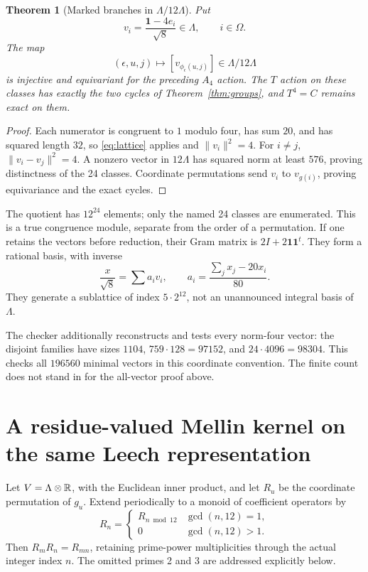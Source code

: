 \documentclass[11pt,reqno]{amsart}
\newtheorem{theorem}{Theorem}[section]
\theoremstyle{definition}\newtheorem{definition}[theorem]{Definition}
\theoremstyle{remark}\newtheorem{remark}[theorem]{Remark}
\begin{document}
\begin{theorem}[Marked branches in $\Lambda/12\Lambda$]\label{thm:mod12}
Put
\[
v_i=\frac{\mathbf1-4e_i}{\sqrt8}\in\Lambda,\qquad i\in\Omega.
\]
The map
\[
(\epsilon,u,j)\longmapsto[v_{\phi_\epsilon(u,j)}]\in\Lambda/12\Lambda
\]
is injective and equivariant for the preceding $A_4$ action. The $T$ action on these classes has exactly the two cycles of Theorem~\ref{thm:groups}, and $T^4=C$ remains exact on them.
\end{theorem}
\begin{proof}
Each numerator is congruent to $1$ modulo four, has sum $20$, and has squared length $32$, so \eqref{eq:lattice} applies and $\|v_i\|^2=4$. For $i\ne j$, $\|v_i-v_j\|^2=4$. A nonzero vector in $12\Lambda$ has squared norm at least $576$, proving distinctness of the 24 classes. Coordinate permutations send $v_i$ to $v_{g(i)}$, proving equivariance and the exact cycles.
\end{proof}
The quotient has $12^{24}$ elements; only the named 24 classes are enumerated. This is a true congruence module, separate from the order of a permutation. If one retains the vectors before reduction, their Gram matrix is $2I+2\mathbf1\mathbf1^t$. They form a rational basis, with inverse
\[
\frac{x}{\sqrt8}=\sum a_i v_i,
\qquad a_i=\frac{\sum_jx_j-20x_i}{80}.
\]
They generate a sublattice of index $5\cdot2^{12}$, not an unannounced integral basis of $\Lambda$.

The checker additionally reconstructs and tests every norm-four vector: the disjoint families have sizes $1104$, $759\cdot128=97152$, and $24\cdot4096=98304$. This checks all $196560$ minimal vectors in this coordinate convention. The finite count does not stand in for the all-vector proof above.

\section{A residue-valued Mellin kernel on the same Leech representation}
Let $V=\Lambda\otimes\mathbb R$, with the Euclidean inner product, and let $R_u$ be the coordinate permutation of $g_u$. Extend periodically to a monoid of coefficient operators by
\[
R_n=\begin{cases}R_{n\bmod12}&\gcd(n,12)=1,\\0&\gcd(n,12)>1.\end{cases}
\]
Then $R_mR_n=R_{mn}$, retaining prime-power multiplicities through the actual integer index $n$. The omitted primes 2 and 3 are addressed explicitly below.
\end{document}
